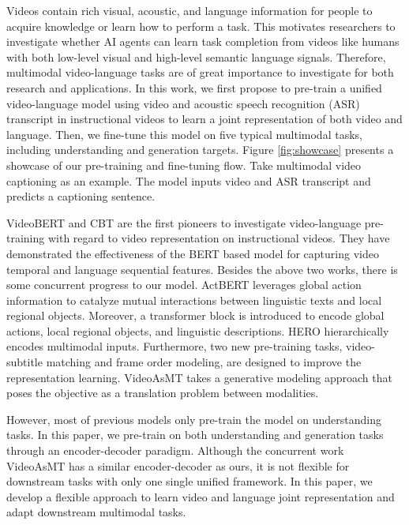 \documentclass[11pt,a4paper]{article}
\begin{document}
	Videos contain rich visual, acoustic, and language information for people to acquire knowledge or learn how to perform a task. This motivates researchers to investigate whether AI agents can learn task completion from videos like humans with both low-level visual and high-level semantic language signals. Therefore, multimodal video-language tasks are of great importance to investigate for both research and applications. In this work, we first propose to pre-train a unified video-language model using video and acoustic speech recognition (ASR) transcript in instructional videos to learn a joint representation of both video and language. Then, we fine-tune this model on five typical multimodal tasks, including understanding and generation targets. Figure \ref{fig:showcase} presents a showcase of our pre-training and fine-tuning flow. Take multimodal video captioning as an example. The model inputs video and ASR transcript and predicts a captioning sentence.
	
	VideoBERT \cite{sun2019videobert} and CBT \cite{sun2019contrastive} are the first pioneers to investigate video-language pre-training with regard to video representation on instructional videos. They have demonstrated the effectiveness of the BERT based model for capturing video temporal and language sequential features. Besides the above two works, there is some concurrent progress to our model. ActBERT \cite{Zhu_2020_CVPR} leverages global action information to catalyze mutual interactions between linguistic texts and local regional objects. Moreover, a  transformer block is introduced to encode global actions, local regional objects, and linguistic descriptions. HERO \cite{Li2020HERO} hierarchically encodes multimodal inputs. Furthermore, two new pre-training tasks, video-subtitle matching and frame order modeling, are designed to improve the representation learning. VideoAsMT \cite{Korbar2020} takes a generative modeling approach that poses the objective as a translation problem between modalities.

	However, most of previous models only pre-train the model on understanding tasks. In this paper, we pre-train on both understanding and generation tasks through an encoder-decoder paradigm. Although the concurrent work VideoAsMT has a similar encoder-decoder as ours, it is not flexible for downstream tasks with only one single unified framework. In this paper, we develop a flexible approach to learn video and language joint representation and adapt downstream multimodal tasks.
	
\end{document}
